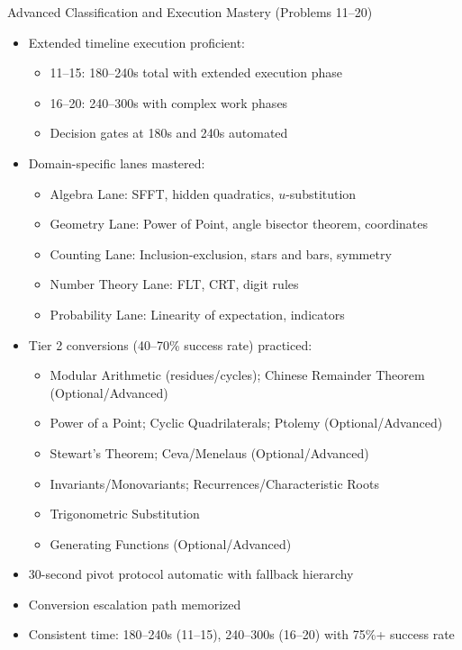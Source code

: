 \documentclass{article}
\begin{document}
\begin{masterybox}{Advanced Classification and Execution Mastery (Problems 11--20)}
\begin{itemize}[nosep]
\item[$\square$] Extended timeline execution proficient:
  \begin{itemize}[nosep]
  \item[$\square$] 11--15: 180--240s total with extended execution phase
  \item[$\square$] 16--20: 240--300s with complex work phases
  \item[$\square$] Decision gates at 180s and 240s automated
  \end{itemize}
\item[$\square$] Domain-specific lanes mastered:
  \begin{itemize}[nosep]
  \item[$\square$] Algebra Lane: SFFT, hidden quadratics, $u$-substitution
  \item[$\square$] Geometry Lane: Power of Point, angle bisector theorem, coordinates
  \item[$\square$] Counting Lane: Inclusion-exclusion, stars and bars, symmetry
  \item[$\square$] Number Theory Lane: FLT, CRT, digit rules
  \item[$\square$] Probability Lane: Linearity of expectation, indicators
  \end{itemize}
\item[$\square$] Tier 2 conversions (40--70\% success rate) practiced:
  \begin{itemize}[nosep]
  \item[$\square$] Modular Arithmetic (residues/cycles); Chinese Remainder Theorem (Optional/Advanced)
  \item[$\square$] Power of a Point; Cyclic Quadrilaterals; Ptolemy (Optional/Advanced)
  \item[$\square$] Stewart's Theorem; Ceva/Menelaus (Optional/Advanced)
  \item[$\square$] Invariants/Monovariants; Recurrences/Characteristic Roots
  \item[$\square$] Trigonometric Substitution
  \item[$\square$] Generating Functions (Optional/Advanced)
  \end{itemize}
\item[$\square$] 30-second pivot protocol automatic with fallback hierarchy
\item[$\square$] Conversion escalation path memorized
\item[$\square$] Consistent time: 180--240s (11--15), 240--300s (16--20) with 75\%+ success rate
\end{itemize}
\end{masterybox}
\end{document}
